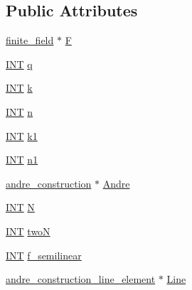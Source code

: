 \subsection*{Public Attributes}
\begin{DoxyCompactItemize}
\item 
\mbox{\hyperlink{classfinite__field}{finite\+\_\+field}} $\ast$ \mbox{\hyperlink{classtranslation__plane__via__andre__model_abafc162683ca3e56e91fc4406d93c0d5}{F}}
\item 
\mbox{\hyperlink{galois_8h_a09fddde158a3a20bd2dcadb609de11dc}{I\+NT}} \mbox{\hyperlink{classtranslation__plane__via__andre__model_aad1b5630ea9233eeb59cf8c5db6f446a}{q}}
\item 
\mbox{\hyperlink{galois_8h_a09fddde158a3a20bd2dcadb609de11dc}{I\+NT}} \mbox{\hyperlink{classtranslation__plane__via__andre__model_a5b68c8ef402956680e2a4d467c78c79e}{k}}
\item 
\mbox{\hyperlink{galois_8h_a09fddde158a3a20bd2dcadb609de11dc}{I\+NT}} \mbox{\hyperlink{classtranslation__plane__via__andre__model_a55755392ab486bec11c8903fe0a56cb3}{n}}
\item 
\mbox{\hyperlink{galois_8h_a09fddde158a3a20bd2dcadb609de11dc}{I\+NT}} \mbox{\hyperlink{classtranslation__plane__via__andre__model_a54a1300d35b69a087fe8d18b09aac2a5}{k1}}
\item 
\mbox{\hyperlink{galois_8h_a09fddde158a3a20bd2dcadb609de11dc}{I\+NT}} \mbox{\hyperlink{classtranslation__plane__via__andre__model_a0098301d2db9a3375206868ec629c771}{n1}}
\item 
\mbox{\hyperlink{classandre__construction}{andre\+\_\+construction}} $\ast$ \mbox{\hyperlink{classtranslation__plane__via__andre__model_aa79ab6e8be4066863fdf657878a2b225}{Andre}}
\item 
\mbox{\hyperlink{galois_8h_a09fddde158a3a20bd2dcadb609de11dc}{I\+NT}} \mbox{\hyperlink{classtranslation__plane__via__andre__model_a70ef7a60b354cf455c51c91287eb8676}{N}}
\item 
\mbox{\hyperlink{galois_8h_a09fddde158a3a20bd2dcadb609de11dc}{I\+NT}} \mbox{\hyperlink{classtranslation__plane__via__andre__model_ac39f5025be63a232501ac0f8532c65b0}{twoN}}
\item 
\mbox{\hyperlink{galois_8h_a09fddde158a3a20bd2dcadb609de11dc}{I\+NT}} \mbox{\hyperlink{classtranslation__plane__via__andre__model_ad7e4460053b5f329dca2c8beab05e347}{f\+\_\+semilinear}}
\item 
\mbox{\hyperlink{classandre__construction__line__element}{andre\+\_\+construction\+\_\+line\+\_\+element}} $\ast$ \mbox{\hyperlink{classtranslation__plane__via__andre__model_a3630b5099083c226cf3deaf4cc6092e7}{Line}}

\end{DoxyCompactItemize}

